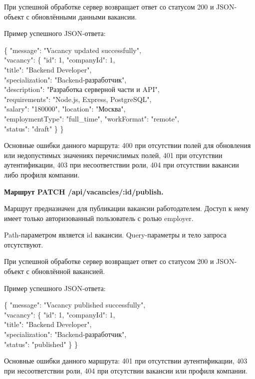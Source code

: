 При успешной обработке сервер возвращает ответ со статусом 200 и JSON-объект с обновлёнными данными вакансии.

Пример успешного JSON-ответа:

\begin{flushleft}
	\small\ttfamily
	\{ "message": "Vacancy updated successfully",\\
	"vacancy": \{ "id": 1, "companyId": 1,\\
	"title": "Backend Developer",\\
	"specialization": "Backend-разработчик",\\
	"description": "Разработка серверной части и API",\\
	"requirements": "Node.js, Express, PostgreSQL",\\
	"salary": "180000", "location": "Москва",\\
	"employmentType": "full\_time", "workFormat": "remote",\\
	"status": "draft" \} \}
\end{flushleft}

Основные ошибки данного маршрута: 400 при отсутствии полей для обновления или недопустимых значениях перечислимых полей, 401 при отсутствии аутентификации, 403 при несоответствии роли, 404 при отсутствии вакансии либо профиля компании.

\textbf{Маршрут PATCH /api/vacancies/:id/publish.}

Маршрут предназначен для публикации вакансии работодателем. Доступ к нему имеет только авторизованный пользователь с ролью employer.

Path-параметром является id вакансии. Query-параметры и тело запроса отсутствуют.

При успешной обработке сервер возвращает ответ со статусом 200 и JSON-объект с обновлённой вакансией.

Пример успешного JSON-ответа:

\begin{flushleft}
	\small\ttfamily
	\{ "message": "Vacancy published successfully",\\
	"vacancy": \{ "id": 1, "companyId": 1,\\
	"title": "Backend Developer",\\
	"specialization": "Backend-разработчик",\\
	"status": "published" \} \}
\end{flushleft}

Основные ошибки данного маршрута: 401 при отсутствии аутентификации, 403 при несоответствии роли, 404 при отсутствии вакансии или профиля компании.

